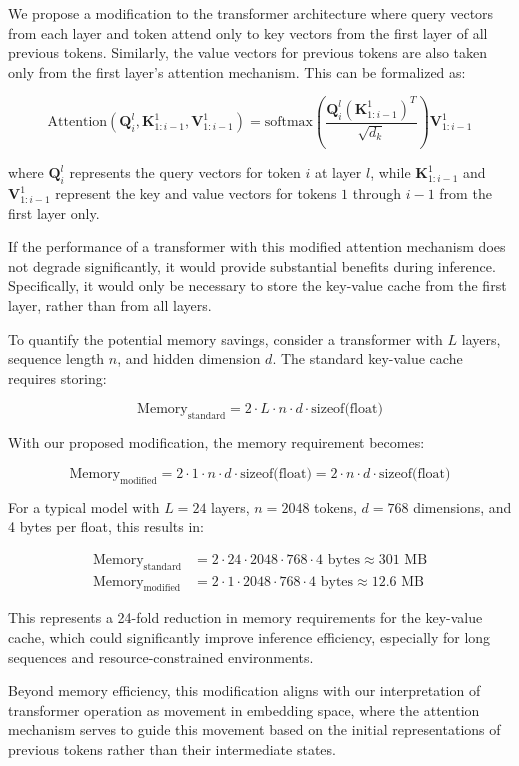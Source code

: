We propose a modification to the transformer architecture where query vectors from each layer and token attend only to key vectors from the first layer of all previous tokens. Similarly, the value vectors for previous tokens are also taken only from the first layer's attention mechanism. This can be formalized as:

\begin{equation}
    \text{Attention}(\mathbf{Q}_i^l, \mathbf{K}_{1:i-1}^1, \mathbf{V}_{1:i-1}^1) = \text{softmax}\left(\frac{\mathbf{Q}_i^l (\mathbf{K}_{1:i-1}^1)^T}{\sqrt{d_k}}\right) \mathbf{V}_{1:i-1}^1
    \label{eq::first_layer_attention}
\end{equation}

where $\mathbf{Q}_i^l$ represents the query vectors for token $i$ at layer $l$, while $\mathbf{K}_{1:i-1}^1$ and $\mathbf{V}_{1:i-1}^1$ represent the key and value vectors for tokens $1$ through $i-1$ from the first layer only.

If the performance of a transformer with this modified attention mechanism does not degrade significantly, it would provide substantial benefits during inference. Specifically, it would only be necessary to store the key-value cache from the first layer, rather than from all layers.

To quantify the potential memory savings, consider a transformer with $L$ layers, sequence length $n$, and hidden dimension $d$. The standard key-value cache requires storing:

\begin{equation}
    \text{Memory}_{\text{standard}} = 2 \cdot L \cdot n \cdot d \cdot \text{sizeof(float)}
    \label{eq::standard_kv_memory}
\end{equation}

With our proposed modification, the memory requirement becomes:

\begin{equation}
    \text{Memory}_{\text{modified}} = 2 \cdot 1 \cdot n \cdot d \cdot \text{sizeof(float)} = 2 \cdot n \cdot d \cdot \text{sizeof(float)}
    \label{eq::modified_kv_memory}
\end{equation}

For a typical model with $L = 24$ layers, $n = 2048$ tokens, $d = 768$ dimensions, and 4 bytes per float, this results in:

\begin{align}
    \text{Memory}_{\text{standard}} &= 2 \cdot 24 \cdot 2048 \cdot 768 \cdot 4 \text{ bytes} \approx 301 \text{ MB} \\
    \text{Memory}_{\text{modified}} &= 2 \cdot 1 \cdot 2048 \cdot 768 \cdot 4 \text{ bytes} \approx 12.6 \text{ MB}
\end{align}

This represents a 24-fold reduction in memory requirements for the key-value cache, which could significantly improve inference efficiency, especially for long sequences and resource-constrained environments.

Beyond memory efficiency, this modification aligns with our interpretation of transformer operation as movement in embedding space, where the attention mechanism serves to guide this movement based on the initial representations of previous tokens rather than their intermediate states.
